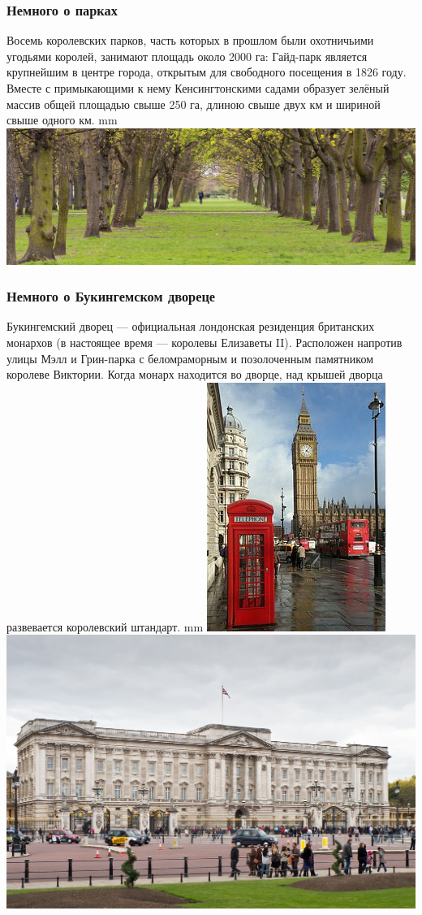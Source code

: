 \documentclass{beamer}
\begin{document}
\begin{frame}
\frametitle{Немного о парках}
Восемь королевских парков, часть которых в прошлом были охотничьими угодьями королей, занимают площадь около 2000 га: Гайд-парк является 
крупнейшим в центре города, открытым для свободного посещения в 1826 году. Вместе с примыкающими к нему 
Кенсингтонскими садами образует зелёный массив общей площадью свыше 250 га, длиною свыше двух км и шириной свыше одного км. 
 mm 
\centering\includegraphics[width=1\linewidth]{park02.jpg}
\end{frame}

\begin{frame}
\frametitle{Немного о Букингемском двореце}
Букингемский дворец --- официальная лондонская резиденция 
британских монархов (в настоящее время --- королевы Елизаветы II). 
Расположен напротив улицы Мэлл и Грин-парка с беломраморным и 
позолоченным памятником королеве Виктории. 
Когда монарх находится во дворце, над крышей дворца 
развевается королевский штандарт. 
 mm
\hspace{8 mm}
\includegraphics[width=0.3\linewidth]{london5.jpg}
\hspace{1 cm}
\includegraphics[width=0.5\linewidth]{london01.jpg}
\end{frame}
\end{document}
